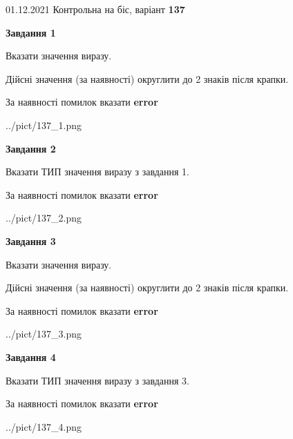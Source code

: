 \documentclass[11pt, ukrainian]{article}
\begin{document}
{01.12.2021 Контрольна на біс, варіант  \No \textbf { 137 }\par}
{
\begin {large}
{\begin {center}\textbf{Завдання 1}\end {center}}\par
Вказати значення виразу. \par
Дійсні значення (за наявності) округлити до 2 знаків після крапки. \par
За наявності помилок вказати \textbf{error}

\begin{center}
	{../pict/137_1.png}
\end{center}
\newpage

{\begin {center}\textbf{Завдання 2}\end {center}}\par
Вказати ТИП значення виразу з завдання 1. \par
За наявності помилок вказати \textbf{error}

\begin{center}
	{../pict/137_2.png}
\end{center}
\newpage

{\begin {center}\textbf{Завдання 3}\end {center}}\par
Вказати значення виразу. \par
Дійсні значення (за наявності) округлити до 2 знаків після крапки. \par
За наявності помилок вказати \textbf{error}

\begin{center}
	{../pict/137_3.png}
\end{center}
\newpage

{\begin {center}\textbf{Завдання 4}\end {center}}\par
Вказати ТИП значення виразу з завдання 3. \par
За наявності помилок вказати \textbf{error}

\begin{center}
	{../pict/137_4.png}
\end{center}
\newpage


\end{large}}
\end{document}
